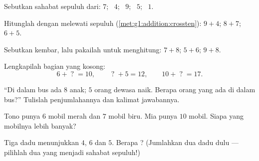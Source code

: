 \begin{exercise}[$\star$]\label{exo:g1:addition:3}
Sebutkan sahabat sepuluh dari: $7$; \ $4$; \ $9$; \ $5$; \ $1$.
\end{exercise}

\begin{exercise}[$\star$]\label{exo:g1:addition:4}
Hitunglah dengan melewati sepuluh (\cref{met:g1:addition:crossten}):
$9 + 4$; \quad $8 + 7$; \quad $6 + 5$.
\end{exercise}

\begin{exercise}[$\star$]\label{exo:g1:addition:5}
Sebutkan  kembar, lalu pakailah untuk menghitung: $7 + 8$; \quad
$5 + 6$; \quad $9 + 8$.
\end{exercise}

\begin{exercise}[$\star$]\label{exo:g1:addition:6}
Lengkapilah bagian yang kosong:
\[
6 + \;?\; = 10, \qquad
\;?\; + 5 = 12, \qquad
10 + \;?\; = 17 .
\]
\end{exercise}

\begin{exercise}[$\star$]\label{exo:g1:addition:7}
``Di dalam bus ada $8$ anak; $5$ orang dewasa naik. Berapa orang yang
ada di dalam bus?'' Tulislah penjumlahannya dan kalimat jawabannya.
\end{exercise}

\begin{exercise}[$\star$]\label{exo:g1:addition:8}
Tono punya $6$ mobil merah dan $7$ mobil biru. Mia punya $10$ mobil.
Siapa yang mobilnya lebih banyak?
\end{exercise}

\begin{exercise}[$\star\star$]\label{exo:g1:addition:9}
Tiga dadu menunjukkan $4$, $6$ dan $5$. Berapa ? (Jumlahkan
dua dadu dulu --- pilihlah dua yang menjadi sahabat sepuluh!)

\end{exercise}

